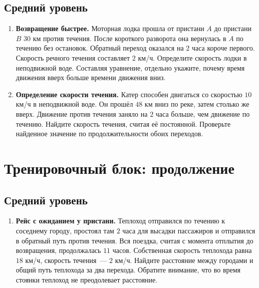 \documentclass[a4paper,12pt]{article}
\begin{document}
\subsection*{Средний уровень}
\begin{enumerate}[label=\textcolor{accent}{\bfseries\arabic*.},leftmargin=8mm,itemsep=8pt,start=4]
\item \textbf{Возвращение быстрее.} Моторная лодка прошла от пристани $A$ до пристани $B$ $30$ км против течения. После короткого разворота она вернулась в $A$ по течению без остановок. Обратный переход оказался на $2$ часа короче первого. Скорость речного течения составляет $2$ км/ч. Определите скорость лодки в неподвижной воде. Составляя уравнение, отдельно укажите, почему время движения вверх больше времени движения вниз.

\item \textbf{Определение скорости течения.} Катер способен двигаться со скоростью $10$ км/ч в неподвижной воде. Он прошёл $48$ км вниз по реке, затем столько же вверх. Движение против течения заняло на $2$ часа больше, чем движение по течению. Найдите скорость течения, считая её постоянной. Проверьте найденное значение по продолжительности обоих переходов.

\end{enumerate}
\clearpage
\section*{Тренировочный блок: продолжение}
\subsection*{Средний уровень}
\begin{enumerate}[label=\textcolor{accent}{\bfseries\arabic*.},leftmargin=8mm,itemsep=8pt,start=6]
\item \textbf{Рейс с ожиданием у пристани.} Теплоход отправился по течению к соседнему городу, простоял там $2$ часа для высадки пассажиров и отправился в обратный путь против течения. Вся поездка, считая с момента отплытия до возвращения, продолжалась $11$ часов. Собственная скорость теплохода равна $18$ км/ч, скорость течения~--- $2$ км/ч. Найдите расстояние между городами и общий путь теплохода за два перехода. Обратите внимание, что во время стоянки теплоход не преодолевает расстояние.
\end{enumerate}
\end{document}

